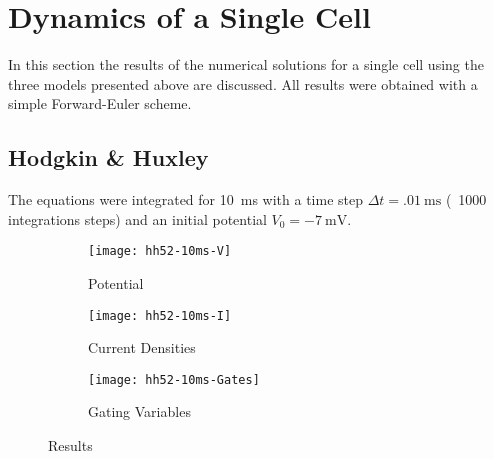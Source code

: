 \section{Dynamics of a Single Cell}
In this section the results of the numerical solutions for a single cell
using the three models presented above are discussed. All results were
obtained with a simple Forward-Euler scheme.

\subsection{Hodgkin \& Huxley}
The equations were integrated for \SI{10}{\milli\second} with a time step
$\Delta{t}=\SI{.01}{\milli\second}$ (\ie~1000 integrations steps) and an
initial potential $V_0=\SI{-7}{\milli\volt}$.

\begin{figure}[h]
    \centering
    \begin{subfigure}[h]{.3\textwidth}
        \texttt{[image: hh52-10ms-V]}
        \label{fig:hh1V}
        \caption{Potential}
    \end{subfigure}
    \begin{subfigure}[h]{.3\textwidth}
        \texttt{[image: hh52-10ms-I]}
        \label{fig:hh1I}
        \caption{Current Densities}
    \end{subfigure}
    \begin{subfigure}[h]{.3\textwidth}
        \texttt{[image: hh52-10ms-Gates]}
        \label{fig:hh1Gates}
        \caption{Gating Variables}
    \end{subfigure}
    \caption{Results}
\end{figure}


